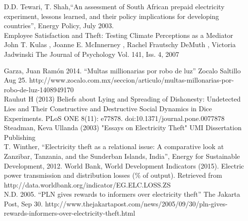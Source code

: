 \documentclass{article}
\begin{document}
D.D. Tewari, T. Shah,“An assessment of South African prepaid electricity experiment, lessons learned, and their policy implications for developing countries”, Energy Policy, July 2003.\\

Employee Satisfaction and Theft: Testing Climate Perceptions as a Mediator
John T. Kulas , Joanne E. McInnerney , Rachel Frautschy DeMuth , Victoria Jadwinski 
The Journal of Psychology 
Vol. 141, Iss. 4, 2007

Garza, Juan Ramón 2014. “Multas millionarias por robo de luz” Zocalo Saltillo Aug 25. http://www.zocalo.com.mx/seccion/articulo/multas-millonarias-por-robo-de-luz-1408949170\\

Rauhut H (2013) Beliefs about Lying and Spreading of Dishonesty: Undetected Lies and Their Constructive and Destructive Social Dynamics in Dice
Experiments. PLoS ONE 8(11): e77878. doi:10.1371/journal.pone.0077878\\

Steadman, Keva Ullanda (2003) "Essays on Electricity Theft"  UMI Dissertation Publishing\\

T. Winther, “Electricity theft as a relational issue: A comparative look at Zanzibar, Tanzania, and the Sunderban Islands, India”, Energy for Sustainable Development, 2012.
World Bank, World Development Indicators (2015). Electric power transmission and distribution losses (\% of output). Retrieved from http://data.worldbank.org/indicator/EG.ELC.LOSS.ZS\\

N.D. 2005.  “PLN gives rewards to informers over electricity theft” The Jakarta Post, Sep 30. http://www.thejakartapost.com/news/2005/09/30/pln-gives-rewards-informers-over-electricity-theft.html
\end{document}
